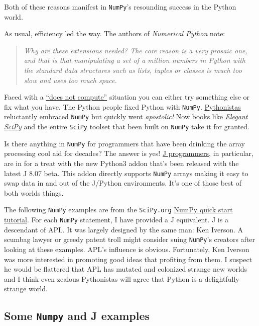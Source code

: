 Both of these reasons manifest in \texttt{NumPy}'s resounding success in
the Python world.

As usual, efficiency led the way. The authors of \emph{Numerical Python}
note:

\begin{quote}
\emph{Why are these extensions needed? The core reason is a very prosaic one,
and that is that manipulating a set of a million numbers in Python with
the standard data structures such as lists, tuples or classes is much
too slow and uses too much space.}
\end{quote}

Faced with a \href{https://www.youtube.com/watch?v=ZBAijg5Betw}{``does
not compute''} situation you can either try something else or fix what
you have. The Python people fixed Python with \texttt{NumPy}.
\href{https://www.quora.com/Whats-the-exact-difference-between-a-Pythoneer-and-a-Pythonista}{Pythonistas}
reluctantly embraced \texttt{NumPy} but quickly went \emph{apostolic!}
Now books like
\href{http://shop.oreilly.com/product/0636920038481.do}{\emph{Elegant
SciPy}} and the entire \texttt{SciPy} toolset that been built on
\texttt{NumPy} take it for granted.

Is there anything in \texttt{NumPy} for programmers that have been
drinking the array processing cool aid for decades? The answer is yes!
\href{http://code.jsoftware.com/wiki/NuVoc}{J programmers}, in
particular, are in for a treat with the new Python3 addon that's been
released with the latest J 8.07 beta. This addon directly supports
\texttt{NumPy} arrays making it easy to swap data in and out of the
J/Python environments. It's one of those best of both worlds things.

The following \texttt{NumPy} examples are from the \texttt{SciPy.org}
\href{https://docs.scipy.org/doc/numpy-dev/user/quickstart.html}{NumPy
quick start tutorial}. For each \texttt{NumPy} statement, I have
provided a J equivalent. J is a descendant of APL. It was largely
designed by the same man: Ken Iverson. A scumbag lawyer or greedy patent
troll might consider suing \texttt{NumPy}'s creators after looking at
these examples. APL's influence is obvious. Fortunately, Ken Iverson was
more interested in promoting good ideas that profiting from them. I
suspect he would be flattered that APL has mutated and colonized strange
new worlds and I think even zealous Pythonistas will agree that Python
is a delightfully strange world.

\subsection*{\texorpdfstring{Some \texttt{Numpy} and J
examples}{Some Numpy and J examples}}

